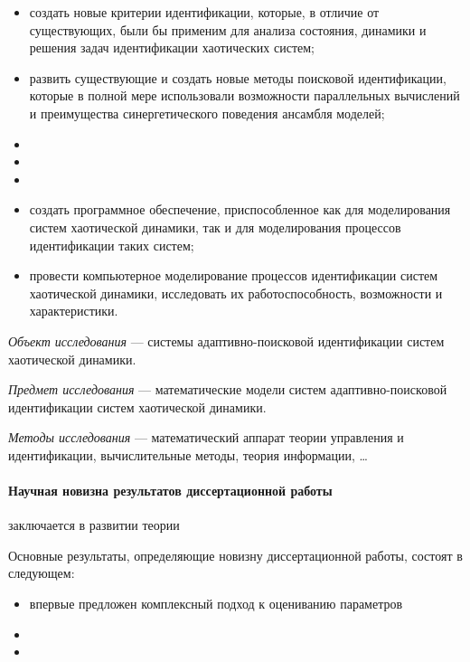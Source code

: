 \begin{itemize}

\item
  создать новые критерии идентификации, которые, в отличие от существующих,
  были бы применим для анализа состояния, динамики и решения задач идентификации
  хаотических систем;

\item
  развить существующие и создать новые методы поисковой идентификации,
  которые в полной мере использовали возможности
  параллельных вычислений и преимущества синергетического поведения
  ансамбля моделей;

\item


\item

\item

\item
  создать программное обеспечение, приспособленное как
  для моделирования систем хаотической динамики,
  так и для моделирования процессов идентификации таких систем;

\item
  провести компьютерное моделирование процессов идентификации систем хаотической динамики,
  исследовать их работоспособность, возможности и характеристики.


\end{itemize}

\textit{Объект исследования} ---
системы адаптивно-поисковой идентификации систем хаотической динамики.

\textit{Предмет исследования} ---
математические модели систем адаптивно-поисковой идентификации систем хаотической динамики.

\textit{Методы исследования} ---
математический аппарат теории управления и идентификации,
вычислительные методы,
теория информации,
\ldots

\paragraph{Научная новизна результатов диссертационной работы} заключается в
развитии теории 

Основные результаты, определяющие новизну диссертационной работы,
состоят в следующем:

\begin{itemize}

\item
  впервые предложен комплексный подход к оцениванию параметров

\item

\item

\end{itemize}


